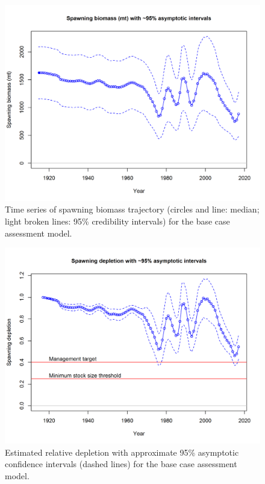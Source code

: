 \documentclass[12pt,]{article}
\begin{document}
\FloatBarrier

\begin{figure}[htbp]
\centering
\includegraphics{r4ss/plots_mod1/ts7_Spawning_biomass_(mt)_with_95_asymptotic_intervals_intervals.png}
\caption{Time series of spawning biomass trajectory (circles and line:
median; light broken lines: 95\% credibility intervals) for the base
case assessment model. \label{fig:Spawnbio_all}}
\end{figure}

\begin{figure}[htbp]
\centering
\includegraphics{r4ss/plots_mod1/ts9_Spawning_depletion_with_95_asymptotic_intervals_intervals.png}
\caption{Estimated relative depletion with approximate 95\% asymptotic
confidence intervals (dashed lines) for the base case assessment model.
\label{fig:RelDeplete_all}}
\end{figure}
\end{document}
